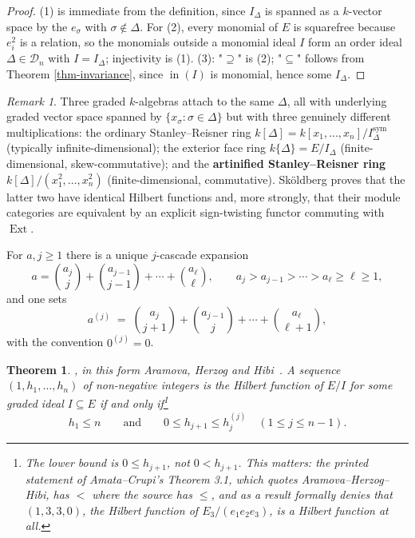 \documentclass[11pt, a4paper, abstract=yes]{scrartcl}
\theoremstyle{definition}
\theoremstyle{remark}
\newtheorem{remark}[definition]{Remark}
\theoremstyle{plain}
\newtheorem{theorem}[definition]{Theorem}
\newcommand{\inn}{\operatorname{in}}
\let\autocite\cite
\begin{document}
\begin{proof}
(1) is immediate from the definition, since \(I_\Delta\) is spanned as a \(k\)-vector space by the
\(e_\sigma\) with \(\sigma\notin\Delta\). For (2), every monomial of \(E\) is squarefree because \(e_i^2\) is a relation, so the monomials outside a monomial ideal \(I\) form an order ideal
\(\Delta\in\mathcal D_n\) with \(I=I_\Delta\); injectivity is (1). (3): "\(\supseteq\)" is (2);
"\(\subseteq\)" follows from Theorem \ref{thm-invariance}, since \(\inn(I)\) is monomial, hence some
\(I_\Delta\).
\end{proof}

\begin{remark}
Three graded \(k\)-algebras attach to the same \(\Delta\), all with underlying graded vector space
spanned by \(\lbrace x_\sigma:\sigma\in\Delta\rbrace\) but with three genuinely different
multiplications: the ordinary Stanley--Reisner ring
\(k[\Delta]=k[x_1,\dots,x_n]/I^{\mathrm{sym}}_\Delta\) (typically infinite-dimensional); the exterior
face ring \(k\lbrace\Delta\rbrace=E/I_\Delta\) (finite-dimensional, skew-commutative); and the
\textbf{artinified Stanley--Reisner ring} \(k[\Delta]/(x_1^2,\dots,x_n^2)\) (finite-dimensional,
commutative). Sköldberg \autocite{Skoldberg1999} proves that the latter two have identical Hilbert functions and, more
strongly, that their module categories are equivalent by an explicit sign-twisting functor commuting
with \(\operatorname{Ext}\).
\label{rem-three-rings}
\end{remark}

For \(a,j\ge1\) there is a unique \(j\)-cascade expansion
\begin{equation}\label{eq:three-rings}
  a=\binom{a_j}{j}+\binom{a_{j-1}}{j-1}+\cdots+\binom{a_\ell}{\ell},
  \qquad a_j>a_{j-1}>\cdots>a_\ell\ge\ell\ge1,
\end{equation}
and one sets
\begin{equation}\label{eq:three-rings-2}
  a^{(j)}\;=\;\binom{a_j}{j+1}+\binom{a_{j-1}}{j}+\cdots+\binom{a_\ell}{\ell+1},
\end{equation}
with the convention \(0^{(j)}=0\).

\begin{theorem}
\autocite{ClementsLindstroem1969,Katona1968,Kruskal1963}, in this form
Aramova, Herzog and Hibi~\cite[Theorem 4.1]{AramovaHerzogHibi1997}. A sequence \((1,h_1,\dots,h_n)\) of non-negative integers is the Hilbert function of
\(E/I\) for some graded ideal \(I\subseteq E\) if and only if\footnote{The lower bound is \(0\le h_{j+1}\), not \(0<h_{j+1}\). This matters: the printed statement of Amata--Crupi's Theorem 3.1, which quotes Aramova--Herzog--Hibi, has \(<\) where the source has \(\le\), and as a result formally denies that \((1,3,3,0)\), the Hilbert function of \(E_3/(e_1e_2e_3)\), is a Hilbert function at all.}
\begin{equation}\label{eq:kk}
  h_1\le n \qquad\text{and}\qquad 0\le h_{j+1}\le h_j^{(j)}\quad (1\le j\le n-1).
\end{equation}
\label{thm-kk}
\end{theorem}
\end{document}
